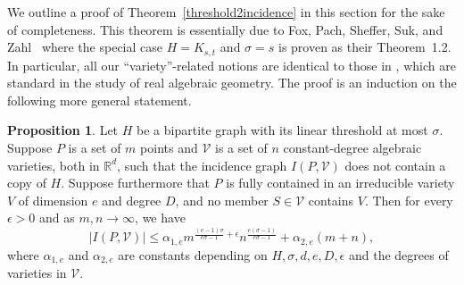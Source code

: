 \documentclass[11pt]{article}
\theoremstyle{definition}
\newtheorem{proposition}[theorem]{Proposition}
\begin{document}
We outline a proof of Theorem~\ref{threshold2incidence} in this section for the sake of completeness. This theorem is essentially due to Fox, Pach, Sheffer, Suk, and Zahl~\cite{fox2017semi} where the special case $H = K_{s,t}$ and $\sigma = s$ is proven as their Theorem~1.2. In particular, all our ``variety''-related notions are identical to those in \cite{fox2017semi}, which are standard in the study of real algebraic geometry. The proof is an induction on the following more general statement.

\begin{proposition}
Let $H$ be a bipartite graph with its linear threshold at most $\sigma$. Suppose $P$ is a set of $m$ points and $\mathcal{V}$ is a set of $n$ constant-degree algebraic varieties, both in $\mathbb{R}^d$, such that the incidence graph $I(P,\mathcal{V})$ does not contain a copy of $H$. Suppose furthermore that $P$ is fully contained in an irreducible variety $V$ of dimension $e$ and degree $D$, and no member $S\in \mathcal{V}$ contains $V$. Then for every $\epsilon > 0$ and as $m,n\to \infty$, we have
\begin{equation}\label{threshold2incidence1}
|I(P,\mathcal{V})| \leq \alpha_{1,e}m^{\frac{(e-1)\sigma}{e\sigma-1}+\epsilon}n^{\frac{e(\sigma-1)}{e\sigma-1}}+\alpha_{2,e}(m+n),
\end{equation}
where $\alpha_{1,e}$ and $\alpha_{2,e}$ are constants depending on $H,\sigma,d,e,D, \epsilon$ and the degrees of varieties in $\mathcal{V}$.
\end{proposition}
\end{document}
